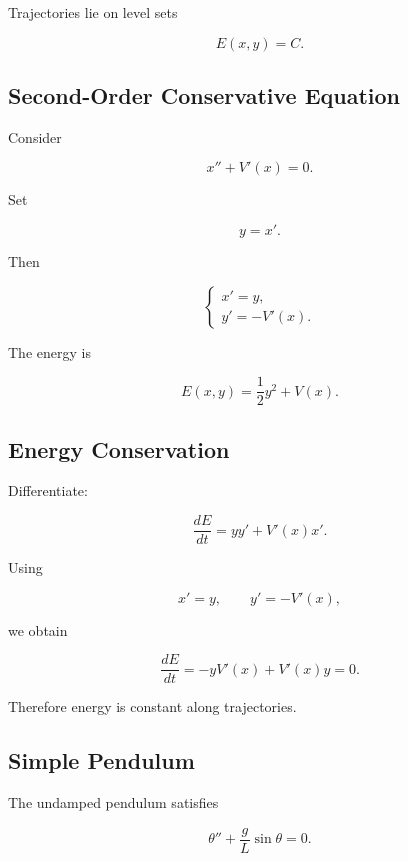Trajectories lie on level sets

\[
\boxed{
E(x,y)=C.
}
\]

\subsection{Second-Order Conservative Equation}
\label{subsec:second-order-conservative}

Consider

\[
\boxed{
x''
+
V'(x)
=
0.
}
\]

Set

\[
y=x'.
\]

Then

\[
\boxed{
\begin{cases}
x'=y,\\
y'=-V'(x).
\end{cases}
}
\]

The energy is

\[
\boxed{
E(x,y)
=
\frac12y^2+V(x).
}
\]

\subsection{Energy Conservation}
\label{subsec:energy-conservation-dynamics}

Differentiate:

\[
\frac{dE}{dt}
=
yy'
+
V'(x)x'.
\]

Using

\[
x'=y,
\qquad
y'=-V'(x),
\]

we obtain

\[
\boxed{
\frac{dE}{dt}
=
-yV'(x)+V'(x)y
=
0.
}
\]

Therefore energy is constant along trajectories.

\subsection{Simple Pendulum}
\label{subsec:simple-pendulum-dynamics}

The undamped pendulum satisfies

\[
\boxed{
\theta''
+
\frac{g}{L}
\sin\theta
=
0.
}
\]

